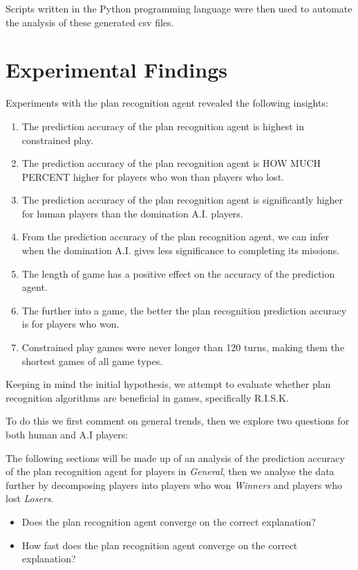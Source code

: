 \documentclass[parskip]{cs4rep}
\begin{document}
Scripts written in the Python programming language were then used to automate the analysis of these generated csv files.

\newpage

\section{Experimental Findings}

Experiments with the plan recognition agent revealed the following insights:

\begin{enumerate}
\item
The prediction accuracy of the plan recognition agent is highest in constrained play. 
\item
The prediction accuracy of the plan recognition agent is HOW MUCH PERCENT higher for players who won than players who lost.
\item
The prediction accuracy of the plan recognition agent is significantly higher for human players than the domination A.I. players.
\item
From the prediction accuracy of the plan recognition agent, we can infer when the domination A.I. gives less significance to completing its missions.
\item
The length of game has a positive effect on the accuracy of the prediction agent.
\item
The further into a game, the better the plan recognition prediction accuracy is for players who won.
\item
Constrained play games were never longer than 120 turns, making them the shortest games of all game types.
\end{enumerate}

Keeping in mind the initial hypothesis, we attempt to evaluate whether plan recognition algorithms are beneficial in games, specifically R.I.S.K.

To do this we first comment on general trends, then we explore two questions for both human and A.I players:

The following sections will be made up of an analysis of the prediction accuracy of the plan recognition agent for players in \textit{General}, then we analyse the data further by decomposing players into players who won \textit{Winners} and players who lost \textit{Losers}.

\begin{itemize}
\item
Does the plan recognition agent converge on the correct explanation?
\item
How fast does the plan recognition agent converge on the correct explanation?
\end{itemize}
\end{document}
